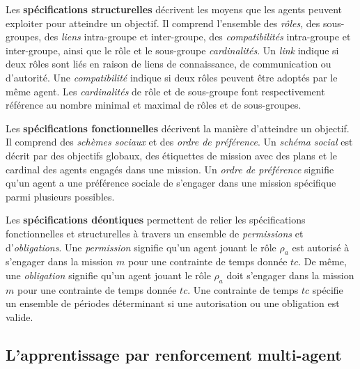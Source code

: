 \documentclass[contribution]{jfsma}
\begin{document}
Les \textbf{spécifications structurelles} décrivent les moyens que les agents peuvent exploiter pour atteindre un objectif. Il comprend l'ensemble des \emph{rôles}, des sous-groupes, des \emph{liens} intra-groupe et inter-groupe, des \emph{compatibilités} intra-groupe et inter-groupe, ainsi que le rôle et le sous-groupe \emph {cardinalités}.
Un \emph{link} indique si deux rôles sont liés en raison de liens de connaissance, de communication ou d'autorité. Une \emph{compatibilité} indique si deux rôles peuvent être adoptés par le même agent. Les \emph{cardinalités} de rôle et de sous-groupe font respectivement référence au nombre minimal et maximal de rôles et de sous-groupes.

Les \textbf{spécifications fonctionnelles} décrivent la manière d'atteindre un objectif. Il comprend des \emph{schèmes sociaux} et des \emph{ordre de préférence}. Un \emph{schéma social} est décrit par des objectifs globaux, des étiquettes de mission avec des plans et le cardinal des agents engagés dans une mission. Un \emph{ordre de préférence} signifie qu'un agent a une préférence sociale de s'engager dans une mission spécifique parmi plusieurs possibles.

Les \textbf{spécifications déontiques} permettent de relier les spécifications fonctionnelles et structurelles à travers un ensemble de \emph{permissions} et d'\emph{obligations}. Une \emph{permission} signifie qu'un agent jouant le rôle $\rho_a$ est autorisé à s'engager dans la mission $m$ pour une contrainte de temps donnée $tc$. De même, une \emph{obligation} signifie qu'un agent jouant le rôle $\rho_a$ doit s'engager dans la mission $m$ pour une contrainte de temps donnée $tc$. Une contrainte de temps $tc $ spécifie un ensemble de périodes déterminant si une autorisation ou une obligation est valide.


\subsection{L'apprentissage par renforcement multi-agent}
\end{document}
